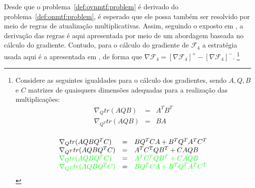 \documentclass[
    12pt,                %
    oneside,            %
    a4paper,            %
    english,            %
    brazil                %
    ]{abntex2ppgsi}
\makeatletter
\newcommand\blfootnote[1]{%
  \begingroup
  \renewcommand\thefootnote{}\footnote{#1}%
  \addtocounter{footnote}{-1}%
  \endgroup
}
\DeclarePairedDelimiter\norm{\lVert}{\rVert}
\let\oldnorm\norm
\def\norm{\@ifstar{\oldnorm}{\oldnorm*}}
\makeatother
\begin{document}

Desde que o problema~\ref{def:ovnmtf:problem} é derivado do problema~\ref{def:onmtf:problem}, é esperado que ele possa também ser resolvido por meio de regras de atualização multiplicativas. Assim, seguindo o exposto em \cite{Ding06}, a derivação das regras é aqui apresentada por meio de um abordagem baseada no cálculo do gradiente. Contudo, para o cálculo do gradiente de $\mathcal{F}_4$ a estratégia usada aqui é a apresentada em , de forma que $\nabla \mathcal{F}_4 = [\nabla \mathcal{F}_4]^+ - [\nabla \mathcal{F}_4]^-$. \blfootnote{Considere as seguintes igualdades para o cálculo dos gradientes, sendo $A, Q, B$ e $C$ matrizes de quaisquers dimensões adequadas para a realização das multiplicações:
\begin{equation}
\label{eq:diff:AQB}
    \begin{array}{lcl}
        \nabla_Q tr( AQB )     & = & A^T B^T \\
        \nabla_{Q^T} tr( AQB ) & = & BA \\
    \end{array}
\end{equation}

\begin{equation}
\label{eq:diff:AQBQtC}
    \begin{array}{lcl}
        \nabla_Q tr( AQBQ^TC )     & = & BQ^TCA + B^TQ^TA^TC^T \\
        \nabla_{Q^T} tr( AQBQ^TC ) & = & A^TC^TQB^T + CAQB \\
        \textcolor{green}{\nabla_Q tr( AQBQ^TC )}     & = & \textcolor{green}{A^TC^TQB^T + CAQB} \\
        \textcolor{green}{\nabla_{Q^T} tr( AQBQ^TC )} & = & \textcolor{green}{BQ^TCA + B^TQ^TA^TC^T}
    \end{array}
\end{equation}
}

\end{document}
